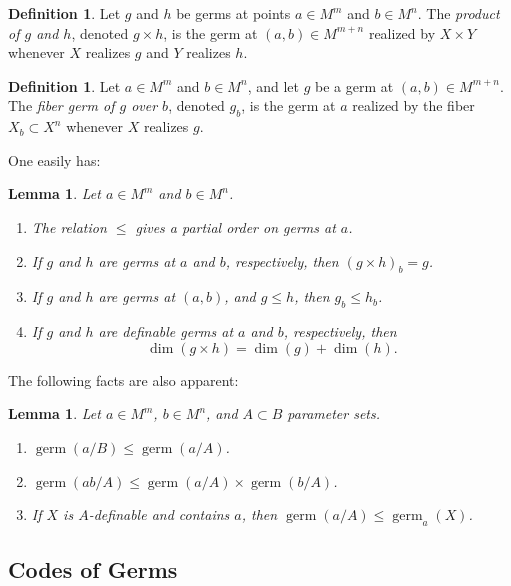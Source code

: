 \documentclass{amsart}
\newtheorem{lemma}[theorem]{Lemma}
\theoremstyle{definition}
\newtheorem{definition}[theorem]{Definition}
\begin{document}
\begin{definition}
    Let $g$ and $h$ be germs at points $a\in M^m$ and $b\in M^n$. The \textit{product of $g$ and $h$}, denoted $g\times h$, is the germ at $(a,b)\in M^{m+n}$ realized by $X\times Y$ whenever $X$ realizes $g$ and $Y$ realizes $h$.
\end{definition}

\begin{definition}
    Let $a\in M^m$ and $b\in M^n$, and let $g$ be a germ at $(a,b)\in M^{m+n}$. The \textit{fiber germ of $g$ over $b$}, denoted $g_b$, is the germ at $a$ realized by the fiber $X_b\subset X^n$ whenever $X$ realizes $g$.
\end{definition}

One easily has:

\begin{lemma}\label{L: germ facts}
    Let $a\in M^m$ and $b\in M^n$.
    \begin{enumerate}
        \item The relation $\leq$ gives a partial order on germs at $a$.
        \item If $g$ and $h$ are germs at $a$ and $b$, respectively, then $(g\times h)_b=g$.
        \item If $g$ and $h$ are germs at $(a,b)$, and $g\leq h$, then $g_b\leq h_b$.
        \item If $g$ and $h$ are definable germs at $a$ and $b$, respectively, then $$\dim(g\times h)=\dim(g)+\dim(h).$$
    \end{enumerate}
\end{lemma}

The following facts are also apparent:

\begin{lemma}\label{L: type germ facts}
    Let $a\in M^m$, $b\in M^n$, and $A\subset B$ parameter sets.
    \begin{enumerate}
        \item $\operatorname{germ}(a/B)\leq\operatorname{germ}(a/A)$.
         \item $\operatorname{germ}(ab/A)\leq\operatorname{germ}(a/A)\times\operatorname{germ}(b/A)$.
        \item If $X$ is $A$-definable and contains $a$, then $\operatorname{germ}(a/A)\leq\operatorname{germ}_a(X)$.
    \end{enumerate}
\end{lemma}


\subsection{Codes of Germs}
\end{document}

